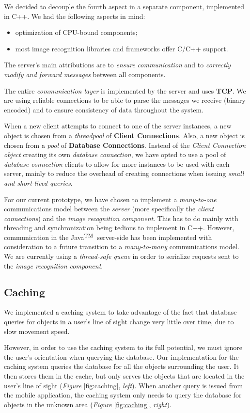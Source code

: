 \documentclass[a4paper,onecolumn,oneside,titlepage,11pt]{report}
\def\tm{\leavevmode\hbox{$\rm {}^{TM}$}}
\begin{document}
We decided to decouple the fourth aspect in a separate component, implemented in C++. We had the following aspects in mind:
\begin{itemize}
	\item optimization of CPU-bound components;
	\item most image recognition libraries and frameworks offer C/C++ support.
\end{itemize}
The server's main attributions are to \emph{ensure communication} and to \emph{correctly modify and forward messages} between all components.

The entire \emph{communication layer} is implemented by the server and uses \textbf{TCP}. We are using reliable connections to be able to parse the messages we receive (binary encoded) and to ensure consistency of data throughout the system.

When a new client attempts to connect to one of the server instances, a new object is chosen from a \emph{threadpool} of \textbf{Client Connections}. Also, a new object is chosen from a \emph{pool} of \textbf{Database Connections}. Instead of the \emph{Client Connection object} creating its own \emph{database connection}, we have opted to use a pool of \emph{database connection} clients to allow for more instances to be used with each server, mainly to reduce the overhead of creating connections when issuing \emph{small and short-lived queries}.

For our current prototype, we have chosen to implement a \emph{many-to-one} communications model between the \emph{server} (more specifically the \emph{client connections}) and the \emph{image recognition component}. This has to do mainly with threading and synchronization being tedious to implement in C++. However, communication in the Java\tm\ server-side has been implemented with consideration to a future transition to a \emph{many-to-many} communications model. We are currently using a \emph{thread-safe queue} in order to serialize requests sent to the \emph{image recognition component}.

\subsection{Caching}
We implemented a caching system to take advantage of the fact that database queries for objects in a user's line of sight change very little over time, due to slow movement speed.

However, in order to use the caching system to its full potential, we must ignore the user's orientation when querying the database. Our implementation for the caching system queries the database for all the objects surrounding the user. It then stores them in the cache, but only serves the objects that are located in the user's line of sight (\emph{Figure} \ref{fig:caching}, \emph{left}). When another query is issued from the mobile application, the caching system only needs to query the database for objects in the unknown area (\emph{Figure} \ref{fig:caching}, \emph{right}).
\end{document}
